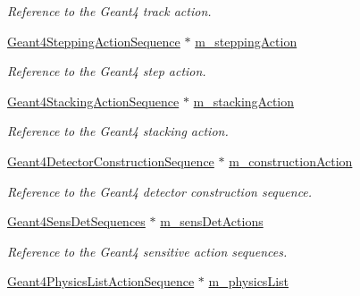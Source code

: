 \begin{DoxyCompactItemize}
\begin{DoxyCompactList}\small\item\em Reference to the Geant4 track action. \item\end{DoxyCompactList}\item 
\hyperlink{class_d_d4hep_1_1_simulation_1_1_geant4_stepping_action_sequence}{Geant4SteppingActionSequence} $\ast$ \hyperlink{class_d_d4hep_1_1_simulation_1_1_geant4_action_container_a45d1b85f3238c5658fef9a0170c40ae1}{m\_\-steppingAction}
\begin{DoxyCompactList}\small\item\em Reference to the Geant4 step action. \item\end{DoxyCompactList}\item 
\hyperlink{class_d_d4hep_1_1_simulation_1_1_geant4_stacking_action_sequence}{Geant4StackingActionSequence} $\ast$ \hyperlink{class_d_d4hep_1_1_simulation_1_1_geant4_action_container_a2fafe23afaf2000c04de123052b7e785}{m\_\-stackingAction}
\begin{DoxyCompactList}\small\item\em Reference to the Geant4 stacking action. \item\end{DoxyCompactList}\item 
\hyperlink{class_d_d4hep_1_1_simulation_1_1_geant4_detector_construction_sequence}{Geant4DetectorConstructionSequence} $\ast$ \hyperlink{class_d_d4hep_1_1_simulation_1_1_geant4_action_container_a98e2929884380e696c80a9c50c072afe}{m\_\-constructionAction}
\begin{DoxyCompactList}\small\item\em Reference to the Geant4 detector construction sequence. \item\end{DoxyCompactList}\item 
\hyperlink{class_d_d4hep_1_1_simulation_1_1_geant4_sens_det_sequences}{Geant4SensDetSequences} $\ast$ \hyperlink{class_d_d4hep_1_1_simulation_1_1_geant4_action_container_ae9a092ff4aa75024c19b392f227abdef}{m\_\-sensDetActions}
\begin{DoxyCompactList}\small\item\em Reference to the Geant4 sensitive action sequences. \item\end{DoxyCompactList}\item 
\hyperlink{class_d_d4hep_1_1_simulation_1_1_geant4_physics_list_action_sequence}{Geant4PhysicsListActionSequence} $\ast$ \hyperlink{class_d_d4hep_1_1_simulation_1_1_geant4_action_container_a8cd72bfb49bd3d62e899591ae65fe7dd}{m\_\-physicsList}

\end{DoxyCompactItemize}
